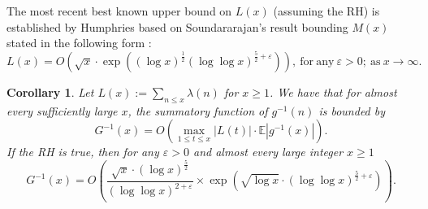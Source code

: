\documentclass[11pt,reqno,a4letter]{article}
\numberwithin{figure}{section}
\numberwithin{table}{section}
\theoremstyle{plain}
\newtheorem{cor}[theorem]{Corollary}
\numberwithin{theorem}{section}
\theoremstyle{definition}
\begin{document}
The most recent best known upper bound on $L(x)$ (assuming the RH) is established by 
Humphries based on Soundararajan's result bounding $M(x)$ 
stated in the following form \cite{HUMPHRIES-JNT-2013}: 
\begin{equation} 
\label{eqn_LxBigOhAsymptotics_Humphries_v1}
L(x) = O\left(\sqrt{x} \cdot \exp\left( (\log x)^{\frac{1}{2}} 
     (\log\log x)^{\frac{5}{2} + \varepsilon}\right)\right), 
     \mathrm{\ for\ any\ } \varepsilon > 0; 
     \mathrm{\ as\ } x \rightarrow \infty.
\end{equation}

\begin{cor} 
\label{cor_ExprForGInvxByLx_v1} 
Let $L(x) := \sum_{n \leq x} \lambda(n)$ for $x \geq 1$. We have that for 
almost every sufficiently large $x$, the summatory function of $g^{-1}(n)$ is bounded by 
$$G^{-1}(x) = O\left(\max_{1 \leq t \leq x} |L(t)| \cdot \mathbb{E}|g^{-1}(x)|\right).$$ 
If the RH is true, then 
for any $\varepsilon > 0$ and almost every large integer $x \geq 1$ 
\[
G^{-1}(x) = O\left( 
     \frac{\sqrt{x} \cdot (\log x)^{\frac{5}{2}}}{(\log\log x)^{2 + \varepsilon}} \times 
     \exp\left(\sqrt{\log x} \cdot (\log\log x)^{\frac{5}{2} + \varepsilon}\right) 
     \right). 
\]
\end{cor} 
\end{document}

